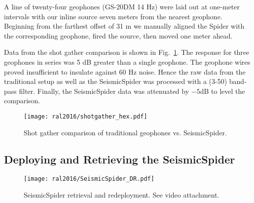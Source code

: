 A line of twenty-four geophones (GS-20DM 14 Hz) were laid out at one-meter intervals with our inline source seven meters from the nearest geophone. Beginning from the farthest offset of 31 m we manually aligned the Spider with the corresponding geophone, fired the source, then moved one meter ahead. 

Data from the shot gather comparison is shown in Fig.~\ref{fig:shotgatherHexpod}.
The response for three geophones in series was 5 dB greater than a single geophone. The geophone wires proved insufficient to insulate against 60 Hz noise. Hence the raw data from the traditional setup as well as the SeismicSpider was processed with a (3-50) band-pass filter. Finally, the SeismicSpider data was attenuated by $-5$dB to level the comparison.    

\begin{figure} \centering
  \texttt{[image: ral2016/shotgather\_hex.pdf]}
 \caption{Shot gather comparison of traditional geophones vs. SeismicSpider. 
 \label{fig:shotgatherHexpod}}
\end{figure}



\subsection{Deploying and Retrieving the SeismicSpider}

\begin{figure} \centering
  \texttt{[image: ral2016/SeismicSpider\_DR.pdf]}
 \caption{SeismicSpider retrieval and redeployment. See video attachment. 
 \label{fig:SeismicSpiderDR}}
\end{figure}

